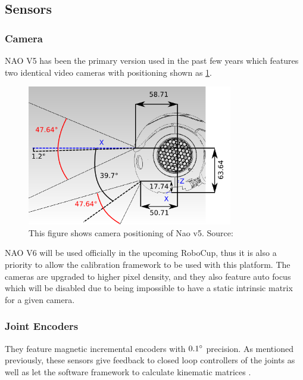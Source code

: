\documentclass[english, printversion, nomenclature, notitle]{tuvisionthesis} %
\begin{document}
\subsection{Sensors}
\subsubsection{Camera}
NAO V5 has been the primary version used in the past few years which features two identical video cameras with positioning shown as \cref{fig:naov5_cameras}.

\begin{figure}
	\begin{center}
		\includegraphics[width=0.8\textwidth]{nao_hardware_camera_lateral.png}
		\caption[Nao v5 camera positioning]{This figure shows camera positioning of Nao v5. Source: \cite{softbank_robotics_video_nodate}}
		\label{fig:naov5_cameras}
	\end{center}
\end{figure}
NAO V6 will be used officially in the upcoming RoboCup, thus it is also a priority to allow the calibration framework to be used with this platform. The cameras are upgraded to higher pixel density, and they also feature auto focus which will be disabled due to being impossible to have a static intrinsic matrix for a given camera.

\subsubsection{Joint Encoders}
\label{subsub:jointEncoders}

They feature magnetic incremental encoders with $0.1\degree$ precision. As mentioned previously, these sensors give feedback to closed loop controllers of the joints as well as let the software framework to calculate kinematic matrices \cite{softbank_robotics_joint_nodate}.
\end{document}
